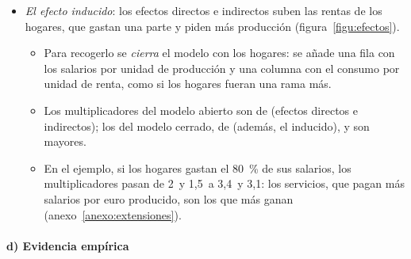 \documentclass[11pt]{article}
\begin{document}
\begin{itemize}
\begin{itemize}
  \item Los multiplicadores de empleo son $\vect{a}_L^{\top}(I-A)^{-1}=(0{,}27;\ 0{,}28)$ miles por millón: la industria emplea 100~personas por millón que produce, pero su demanda crea 267: 133~en la propia industria y otros 133~en los servicios.
  \end{itemize}
\item \emph{El efecto inducido}: los efectos directos e indirectos suben las rentas de los hogares, que gastan una parte y piden más producción (figura~\ref{figu:efectos}).
  \begin{itemize}
  \item Para recogerlo se \emph{cierra} el modelo con los hogares: se añade una fila con los salarios por unidad de producción y una columna con el consumo por unidad de renta, como si los hogares fueran una rama más\nocite{MillerBlair2022}.
  \item Los multiplicadores del modelo abierto son de  (efectos directos e indirectos); los del modelo cerrado, de  (además, el inducido), y son mayores.
  \item En el ejemplo, si los hogares gastan el 80~\% de sus salarios, los multiplicadores pasan de 2~y 1,5~a 3,4~y 3,1: los servicios, que pagan más salarios por euro producido, son los que más ganan (anexo~\ref{anexo:extensiones}).
  \end{itemize}
\end{itemize}

\begin{infografia}[H]
\centering
\caption{Efectos directo, indirecto e inducido de un aumento de la demanda final}\label{figu:efectos}
\end{infografia}

\paragraph{d) Evidencia empírica}
\end{document}

